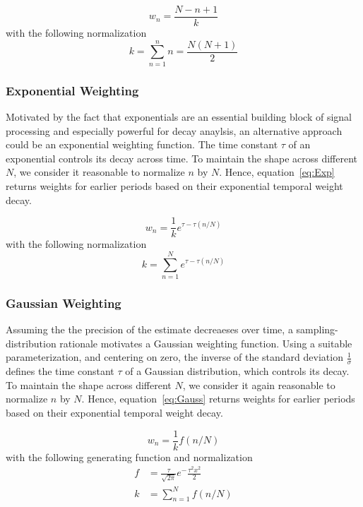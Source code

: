 \documentclass[a4paper]{article}
\begin{document}
\begin{equation}
    w_n = \frac{N-n+1}{k}\label{eq:Linear}
\end{equation}
with the following normalization
\begin{equation}
    k  = \sum_{n=1}^{n} n = \frac{N(N+1)}{2}\label{eq:NormLinear}
\end{equation}

\subsubsection{Exponential Weighting}

Motivated by the fact that exponentials are an essential building block of signal processing and especially powerful for decay anaylsis, an alternative approach could be an exponential weighting function. The time constant $\tau$ of an exponential controls its decay across time. To maintain the shape across different $N$, we consider it reasonable to normalize $n$ by $N$. Hence, equation~\eqref{eq:Exp} returns weights for earlier periods based on their exponential temporal weight decay.

\begin{equation}
    w_n = \frac{1}{k} e^{\tau-\tau{(n/N)}}\label{eq:Exp}
\end{equation}
with the following normalization
\begin{equation}
    k  = \sum_{n=1}^{N} e^{\tau-\tau{(n/N)}}\label{eq:NormExp}
\end{equation}


\subsubsection{Gaussian Weighting}

Assuming the the precision of the estimate decreaeses over time, a sampling-distribution rationale motivates a Gaussian weighting function. Using a suitable parameterization, and centering on zero, the inverse of the standard deviation $\frac{1}{\sigma}$ defines the time constant $\tau$ of a Gaussian distribution, which controls its decay.
To maintain the shape across different $N$, we consider it again reasonable to normalize $n$ by $N$. Hence, equation~\eqref{eq:Gauss} returns weights for earlier periods based on their exponential temporal weight decay.

\begin{equation}
    w_n = \frac{1}{k} f(n/N)\label{eq:Gauss}
\end{equation}
with the following generating function and normalization
\begin{align}
    f  & = \frac{\tau}{\sqrt{2\pi}} e^-\frac{\tau^2x^2}{2}   \\
    k  & = \sum_{n=1}^{N} f(n/N)\label{eq:NormGauss}
\end{align}
\end{document}
